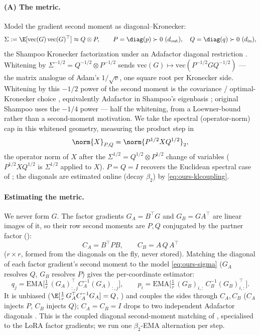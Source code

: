 \paragraph{(A) The metric.} Model the gradient second moment as diagonal--Kronecker:
\begin{equation}
  \Sigma:=\E[\mathrm{vec}(G)\,\mathrm{vec}(G)^\top]\approx Q\otimes P,\qquad
  P=\diag(p)\succ0\ (d_{\mathrm{out}}),\quad Q=\diag(q)\succ0\ (d_{\mathrm{in}}),
  \label{eq:ours-sigma}
\end{equation}
the Shampoo Kronecker factorization \cite{soap} under an Adafactor diagonal restriction \cite{adafactor}. Whitening by $\Sigma^{-1/2}=Q^{-1/2}\otimes P^{-1/2}$ sends $\mathrm{vec}(G)\mapsto\mathrm{vec}(P^{-1/2}GQ^{-1/2})$ --- the matrix analogue of Adam's $1/\!\sqrt{v}$, one square root per Kronecker side. Whitening by this $-1/2$ power of the second moment is the covariance / optimal-Kronecker choice \cite{morwani,klshampoo}, equivalently Adafactor in Shampoo's eigenbasis \cite{soap}; original Shampoo uses the $-1/4$ power \cite{shampoo} --- half the whitening, from a Loewner-bound rather than a second-moment motivation. We take the spectral (operator-norm) cap in this whitened geometry, measuring the product step in
\begin{equation}
  \norm{X}_{P,Q}=\norm{P^{1/2}XQ^{1/2}}_2,
  \label{eq:ours-metric}
\end{equation}
the operator norm of $X$ after the $\Sigma^{1/2}=Q^{1/2}\otimes P^{1/2}$ change of variables ($P^{1/2}XQ^{1/2}$ is $\Sigma^{1/2}$ applied to $X$). $P=Q=I$ recovers the Euclidean spectral case of ; the diagonals are estimated online (decay $\beta_2$) by \eqref{eq:ours-klcoupling}.

\paragraph{Estimating the metric.}
\label{par:coupling}
We never form $G$. The factor gradients $G_A=B^\top G$ and $G_B=GA^\top$ are linear images of it, so their row second moments are $P,Q$ conjugated by the partner factor ():
\begin{equation}
  C_A=B^\top P B,\qquad C_B=A\,Q\,A^\top
  \label{eq:ours-closure}
\end{equation}
($r\times r$, formed from the diagonals on the fly, never stored). Matching the diagonal of each factor gradient's second moment to the model \eqref{eq:ours-sigma} ($G_A$ resolves $Q$, $G_B$ resolves $P$) gives the per-coordinate estimator:
\begin{equation}
  q_j=\mathrm{EMA}\Big[\tfrac1r\,(G_A)_{:,j}^\top C_A^{-1}(G_A)_{:,j}\Big],\qquad
  p_i=\mathrm{EMA}\Big[\tfrac1r\,(G_B)_{i,:}\,C_B^{-1}(G_B)_{i,:}^\top\Big].
  \label{eq:ours-klcoupling}
\end{equation}
It is unbiased ($\E[\tfrac1r\,G_A^\top C_A^{-1}G_A]=Q$, ) and couples the sides through $C_A,C_B$ ($C_A$ injects $P$, $C_B$ injects $Q$); $C_A=C_B=I$ drops to two independent Adafactor diagonals \cite{adafactor}. This is the coupled diagonal second-moment matching of \cite{klshampoo}, specialised to the LoRA factor gradients; we run one $\beta_2$-EMA alternation per step.

